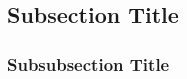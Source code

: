 \subsection{Subsection Title}
\label{subsec:Subsection Title}

\subsubsection{Subsubsection Title}
\label{bb:Subsubsection Title}





\startcontents[chapters] %
\newpage
